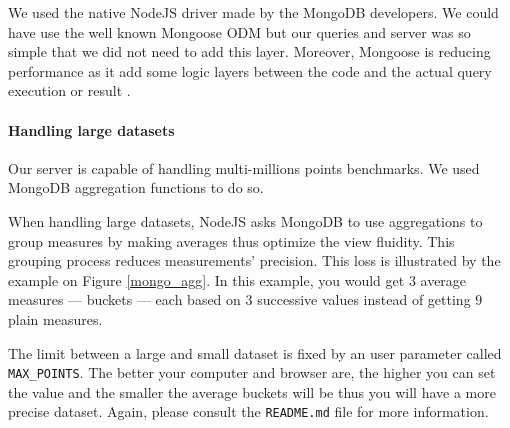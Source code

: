 \documentclass[a4paper,11pt]{report}
\begin{document}
We used the native NodeJS driver made by the MongoDB developers. We could have use the well known Mongoose ODM but our queries and server was so simple that we did not need to add this layer. Moreover, Mongoose is reducing performance as it add some logic layers between the code and the actual query execution or result \cite{mongo}.

\paragraph{Handling large datasets}\label{server:handling_large_dataset}

Our server is capable of handling multi-millions points benchmarks. We used MongoDB aggregation functions to do so.

When handling large datasets, NodeJS asks MongoDB to use aggregations to group measures by making averages thus optimize the view fluidity. This grouping process reduces measurements' precision. This loss is illustrated by the example on Figure \ref{mongo_agg}. In this example, you would get 3 average measures --- buckets --- each based on 3 successive values instead of getting 9 plain measures.

The limit between a large and small dataset is fixed by an user parameter called \texttt{MAX\_POINTS}. The better your computer and browser are, the higher you can set the value and the smaller the average buckets will be thus you will have a more precise dataset. Again, please consult the \texttt{README.md} file for more information.
\end{document}
